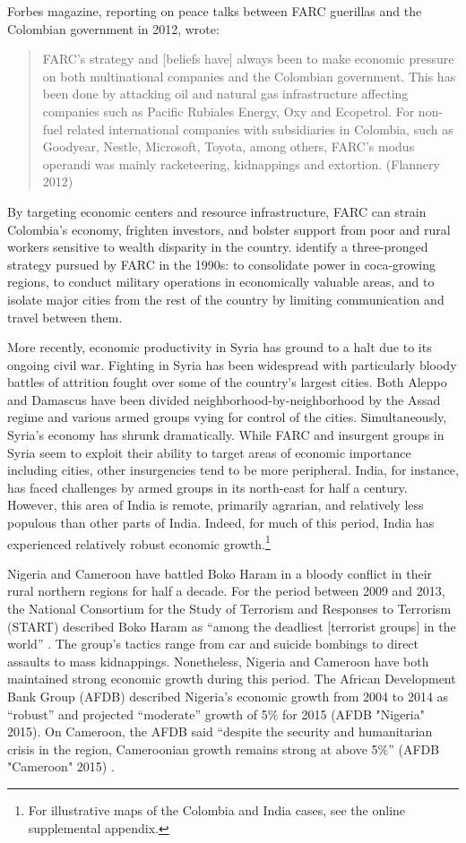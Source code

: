Forbes magazine, reporting on peace talks between FARC guerillas and the Colombian government in 2012, wrote: 

\begin{quote}
	FARC's strategy and [beliefs have] always been to make economic pressure on both multinational companies and the Colombian government. This has been done by attacking oil and natural gas infrastructure affecting companies such as Pacific Rubiales Energy, Oxy and Ecopetrol. For non-fuel related international companies with subsidiaries in Colombia, such as Goodyear, Nestle, Microsoft, Toyota, among others, FARC’s modus operandi was mainly racketeering, kidnappings and extortion. (Flannery 2012)
\end{quote}

By targeting economic centers and resource infrastructure, FARC can strain Colombia's economy, frighten investors, and bolster support from poor and rural workers sensitive to wealth disparity in the country. \citet{rabasa:chalk:2001} identify a three-pronged strategy pursued by FARC in the 1990s: to consolidate power in coca-growing regions, to conduct military operations in economically valuable areas, and to isolate major cities from the rest of the country by limiting communication and travel between them.  

More recently, economic productivity in Syria has ground to a halt due to its ongoing civil war. Fighting in Syria has been widespread with particularly bloody battles of attrition fought over some of the country's largest cities. Both Aleppo and Damascus have been divided neighborhood-by-neighborhood by the Assad regime and various armed groups vying for control of the cities. Simultaneously, Syria's economy has shrunk dramatically. While FARC and insurgent groups in Syria seem to exploit their ability to target areas of economic importance including cities, other insurgencies tend to be more peripheral. India, for instance, has faced challenges by armed groups in its north-east for half a century. However, this area of India is remote, primarily agrarian, and relatively less populous than other parts of India. Indeed, for much of this period, India has experienced relatively robust economic growth.\footnote{For illustrative maps of the Colombia and India cases, see the online supplemental appendix.}

Nigeria and Cameroon have battled Boko Haram in a bloody conflict in their rural northern regions for half a decade. For the period between 2009 and 2013, the National Consortium for the Study of Terrorism and Responses to Terrorism (START) described Boko Haram as ``among the deadliest [terrorist groups] in the world'' \citep{pate:etal:2014}. The group's tactics range from car and suicide bombings to direct assaults to mass kidnappings. Nonetheless, Nigeria and Cameroon have both maintained strong economic growth during this period. The African Development Bank Group (AFDB) described Nigeria's economic growth from 2004 to 2014 as ``robust'' and projected ``moderate'' growth of 5\% for 2015 (AFDB "Nigeria" 2015)\nocite{afdb:nigeria:2015}. On Cameroon, the AFDB said ``despite the security and humanitarian crisis in the region, Cameroonian growth remains strong at above 5\%'' (AFDB "Cameroon" 2015) \nocite{afdb:cameroon:2015}.

